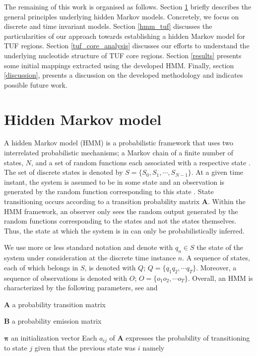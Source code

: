 \documentclass[12pt]{article}
\let\tempone\itemize
\let\temptwo\enditemize
\renewenvironment{itemize}{\tempone\setlength{\itemsep}{0pt}}{\temptwo}
\begin{document}
The remaining of this work is organised as follows. Section \ref{hmm_general} briefly describes the general principles underlying  hidden Markov models. Concretely,  we focus on discrete and time invariant models. 
Section \ref{hmm_tuf} discusses the particularities of our approach towards establishing a hidden Markov model for TUF regions. Section \ref{tuf_core_analysis} discusses our efforts to understand the underlying nucleotide structure of TUF core regions.  Section \ref{results} presents some initial mappings extracted using the developed HMM.
Finally, section \ref{discussion}, presents a discussion on the developed methodology and indicates possible future work. 

\section{Hidden Markov model}
\label{hmm_general}

A hidden Markov model (HMM) is a probabilistic framework that uses two interrelated probabilistic mechanisms; a Markov chain of a finite
number of states, $N$, and a set of random functions each associated with a respective state \cite{koski}.  The set of discrete states is denoted by $S=\{S_0, S_1,\cdots, S_{N-1}\}$. At a given time instant, the 
system is assumed to be in some state and an observation is generated by the random function corresponding to this state  \cite{koski}.
State transitioning occurs according to a transition probability matrix  $\mathbf{A}$. Within  the HMM framework, an observer only sees the random output generated by the random functions corresponding to the states and not the states themselves. Thus, the state at which the system is in can only be probabilistically inferred. 

We use more or less standard notation and denote with $q_n \in S$ the state of the system under consideration at the discrete time instance $n$.  A sequence of states, each of which belongs in $S$, is denoted with $Q$; $Q=\{q_1q_2,\cdots q_T\}$. Moreover, a sequence of observations is denoted with $O$; $O=\{o_1o_2,\cdots o_T\}$. Overall, an HMM is characterized by the following parameters, see \cite{rabiner2009} and \cite{koski}

\begin{itemize}
	\item $\mathbf{A}$ a probability transition matrix
	\item $\mathbf{B}$ a probability emission matrix
	\item $\boldsymbol{\pi}$ an initialization vector
\end{itemize}
Each $a_{ij}$ of $\mathbf{A}$  expresses the probability of transitioning to state $j$ given that the previous state was $i$ namely
\end{document}
